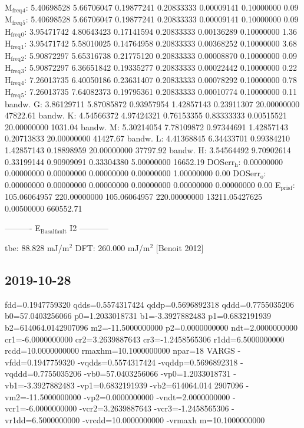 \documentclass[11pt]{article}
\begin{document}
M\(_{\text{freq}}\)\(_{\text{4}}\):   5.40698528   5.66706047   0.19877241   0.20833333   0.00009141   0.10000000         0.09
M\(_{\text{freq}}\)\(_{\text{5}}\):   5.40698528   5.66706047   0.19877241   0.20833333   0.00009141   0.10000000         0.09
H\(_{\text{freq}}\)\(_{\text{0}}\):   3.95471742   4.80643423   0.17141594   0.20833333   0.00136289   0.10000000         1.36
H\(_{\text{freq}}\)\(_{\text{1}}\):   3.95471742   5.58010025   0.14764958   0.20833333   0.00368252   0.10000000         3.68
H\(_{\text{freq}}\)\(_{\text{2}}\):   5.90872297   5.65316738   0.21775120   0.20833333   0.00008870   0.10000000         0.09
H\(_{\text{freq}}\)\(_{\text{3}}\):   5.90872297   6.36651842   0.19335277   0.20833333   0.00022442   0.10000000         0.22
H\(_{\text{freq}}\)\(_{\text{4}}\):   7.26013735   6.40050186   0.23631407   0.20833333   0.00078292   0.10000000         0.78
H\(_{\text{freq}}\)\(_{\text{5}}\):   7.26013735   7.64082373   0.19795361   0.20833333   0.00010774   0.10000000         0.11
bandw. G:   3.86129711   5.87085872   0.93957954   1.42857143   0.23911307  20.00000000     47822.61
bandw. K:   4.54566372   4.97424321   0.76153355   0.83333333   0.00515521  20.00000000      1031.04
bandw. M:   5.30214054   7.78109872   0.97344691   1.42857143   0.20713833  20.00000000     41427.67
bandw. L:   4.41368845   6.34433701   0.99384210   1.42857143   0.18898959  20.00000000     37797.92
bandw. H:   3.54564492   9.70902614   0.33199144   0.90909091   0.33304380   5.00000000     16652.19
DOSerr\(_{\text{h}}\):   0.00000000   0.00000000   0.00000000   0.00000000   0.00000000   1.00000000         0.00
DOSerr\(_{\text{o}}\):   0.00000000   0.00000000   0.00000000   0.00000000   0.00000000   0.00000000         0.00
E\(_{\text{pris}}\)\(_{\text{f}}\): 105.06064957 220.00000000 105.06064957 220.00000000 13211.05427625   0.00500000 660552.71

----------     E\(_{\text{Basal}}\)\(_{\text{fault}}\) I2     -----------

tbe:        88.828 mJ/m\(^{\text{2}}\)
DFT:       260.000 mJ/m\(^{\text{2}}\) [Benoit  2012]


\subsection{2019-10-28}
\label{sec:org2f0f32e}
  fdd=0.1947759320 qdds=0.5574317424 qddp=0.5696892318 qddd=0.7755035206 b0=57.0403256066 p0=1.2033018731 b1=-3.3927882483 p1=0.6832191939 b2=614064.0142907096 m2=-11.5000000000 p2=0.0000000000 ndt=2.0000000000 cr1=-6.0000000000 cr2=3.2639887643 cr3=-1.2458565306 r1dd=6.5000000000 rcdd=10.0000000000 rmaxhm=10.1000000000 npar=18 
VARGS
    -vfdd=0.1947759320 -vqdds=0.5574317424 -vqddp=0.5696892318 -vqddd=0.7755035206 -vb0=57.0403256066 -vp0=1.2033018731 -vb1=-3.3927882483 -vp1=0.6832191939 -vb2=614064.014
2907096 -vm2=-11.5000000000 -vp2=0.0000000000 -vndt=2.0000000000 -vcr1=-6.0000000000 -vcr2=3.2639887643 -vcr3=-1.2458565306 -vr1dd=6.5000000000 -vrcdd=10.0000000000 -vrmaxh
m=10.1000000000 
\end{document}
